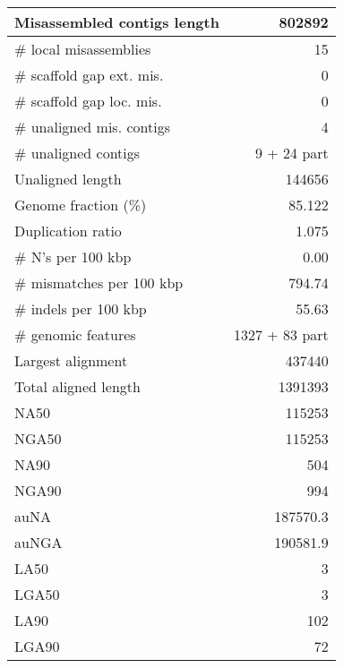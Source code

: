 \documentclass[12pt,a4paper]{article}
\begin{document}
\begin{table}[ht]
\begin{center}
\begin{tabular}{|l*{1}{|r}|}
Misassembled contigs length & 802892 \\ \hline
\# local misassemblies & 15 \\ \hline
\# scaffold gap ext. mis. & 0 \\ \hline
\# scaffold gap loc. mis. & 0 \\ \hline
\# unaligned mis. contigs & 4 \\ \hline
\# unaligned contigs & 9 + 24 part \\ \hline
Unaligned length & 144656 \\ \hline
Genome fraction (\%) & 85.122 \\ \hline
Duplication ratio & 1.075 \\ \hline
\# N's per 100 kbp & 0.00 \\ \hline
\# mismatches per 100 kbp & 794.74 \\ \hline
\# indels per 100 kbp & 55.63 \\ \hline
\# genomic features & 1327 + 83 part \\ \hline
Largest alignment & 437440 \\ \hline
Total aligned length & 1391393 \\ \hline
NA50 & 115253 \\ \hline
NGA50 & 115253 \\ \hline
NA90 & 504 \\ \hline
NGA90 & 994 \\ \hline
auNA & 187570.3 \\ \hline
auNGA & 190581.9 \\ \hline
LA50 & 3 \\ \hline
LGA50 & 3 \\ \hline
LA90 & 102 \\ \hline
LGA90 & 72 \\ \hline
\end{tabular}
\end{center}
\end{table}
\end{document}
